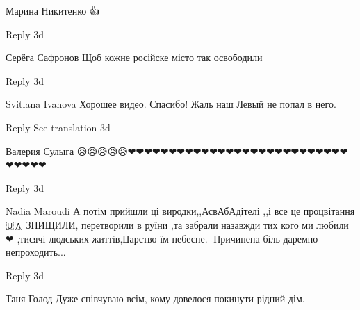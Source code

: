 Марина Никитенко
👍💙💛

    Reply
    3d

Серёга Сафронов
Щоб кожне російске місто так освободили

    Reply
    3d

Svitlana Ivanova
Хорошее видео. Спасибо! Жаль наш Левый не попал в него.

    Reply
    See translation
    3d

Валерия Сулыга
😥😥😥😥😥❤❤❤❤❤❤❤❤❤❤❤❤❤❤❤❤❤❤❤❤❤❤❤❤❤❤❤❤❤❤❤❤

    Reply
    3d

Nadia Maroudi
А потім прийшли ці виродки,,АсвАбАдітелі
,,і все це процвітання🇺🇦 ЗНИЩИЛИ,
перетворили в руїни ,та забрали назавжди тих кого ми любили❤ ,тисячі людських життів,Царство їм небесне.🙏
Причинена біль даремно непроходить...

    Reply
    3d

Таня Голод
Дуже співчуваю всім, кому довелося покинути рідний дім.
